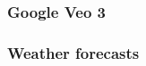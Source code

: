 \begin{frame}
    \frametitle{Google Veo 3}
    
    \begin{figure}
       \centering
    \end{figure}

\end{frame}

\begin{frame}
    \frametitle{Weather forecasts}
    
    \begin{figure}
       \centering
    \end{figure}

\end{frame}


